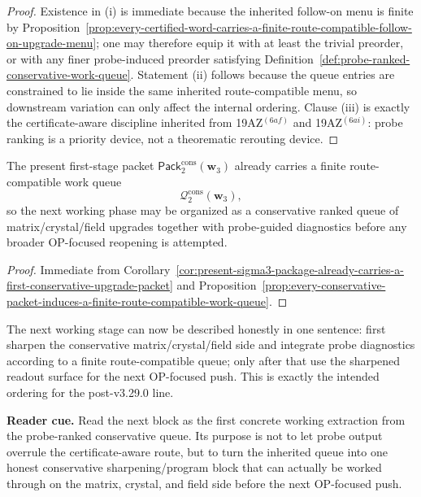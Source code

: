 \begin{proof}
Existence in (i) is immediate because the inherited follow-on menu is finite by Proposition~\ref{prop:every-certified-word-carries-a-finite-route-compatible-follow-on-upgrade-menu}; one may therefore equip it with at least the trivial preorder, or with any finer probe-induced preorder satisfying Definition~\ref{def:probe-ranked-conservative-work-queue}. Statement (ii) follows because the queue entries are constrained to lie inside the same inherited route-compatible menu, so downstream variation can only affect the internal ordering. Clause (iii) is exactly the certificate-aware discipline inherited from 19AZ$^{(6af)}$ and 19AZ$^{(6ai)}$: probe ranking is a priority device, not a theorematic rerouting device.
\end{proof}

\begin{corollary}
\label{cor:first-sigma3-packet-already-carries-a-finite-conservative-work-queue}
The present first-stage packet \(\mathsf{Pack}^{\mathrm{cons}}_{2}(\mathbf w_3)\) already carries a finite route-compatible work queue
\[
  \mathcal Q^{\mathrm{cons}}_{2}(\mathbf w_3),
\]
so the next working phase may be organized as a conservative ranked queue of matrix/crystal/field upgrades together with probe-guided diagnostics before any broader OP-focused reopening is attempted.
\end{corollary}

\begin{proof}
Immediate from Corollary~\ref{cor:present-sigma3-package-already-carries-a-first-conservative-upgrade-packet} and Proposition~\ref{prop:every-conservative-packet-induces-a-finite-route-compatible-work-queue}.
\end{proof}

\begin{remark}
\label{rem:what-this-queue-interface-now-buys}
The next working stage can now be described honestly in one sentence: first sharpen the conservative matrix/crystal/field side and integrate probe diagnostics according to a finite route-compatible queue; only after that use the sharpened readout surface for the next OP-focused push. This is exactly the intended ordering for the post-v3.29.0 line.
\end{remark}


\noindent\textbf{Reader cue.} Read the next block as the first concrete working extraction from the probe-ranked conservative queue. Its purpose is not to let probe output overrule the certificate-aware route, but to turn the inherited queue into one honest conservative sharpening/program block that can actually be worked through on the matrix, crystal, and field side before the next OP-focused push.


